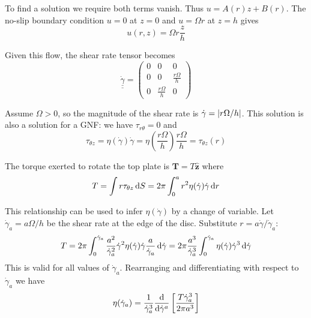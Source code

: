 \documentclass{jknotes}
\newcommand{\dunder}[1]{\underline{\underline{#1}}}
\newcommand{\srate}{\dot{\gamma}}
\begin{document}
To find a solution we require both terms vanish. Thus $u = A(r) z + B(r)$. The
no-slip boundary condition $u = 0$ at $z=0$ and $u = \Omega r$ at $z = h$
gives
\begin{equation}
	u(r,z) = \Omega r \frac{z}{h}
\end{equation}

Given this flow, the shear rate tensor becomes
\begin{equation}
	\dunder{\srate} = \begin{pmatrix} 0 & 0 & 0 \\ 
		0 & 0 & \frac{r \Omega}{h} \\
0 & \frac{r \Omega}{h} & 0 \end{pmatrix}
\end{equation}

Assume $\Omega > 0$, so the magnitude of the shear rate is $\srate =
\abs{r\Omega/h}$. This solution is also a solution for a GNF: we have
$\tau_{r\theta} = 0$ and 
\begin{equation}
	\tau_{\theta z} = \eta(\srate) \srate =
	\eta(\frac{r\Omega}{h})\frac{r\Omega}{h} = \tau_{\theta z} (r)
\end{equation}

The torque exerted to rotate the top plate is $\bm{T} = T\hat{\bm{z}}$ where
\begin{equation}
	T = \int r \tau_{\theta z} \, \diffd S = 2\pi \int_0^a r^2 \eta(\srate)
	\srate \, \diffd r
\end{equation}

This relationship can be used to infer $\eta(\srate)$ by a change of variable.
Let $\srate_a = a\Omega/h$ be the shear rate at the edge of the disc.
Substitute $r = a \srate/\srate_a$:
\begin{equation}
	T = 2\pi \int_0^{\srate_a} \frac{a^2}{\srate_a^2} \srate^2
	\eta(\srate)\srate \frac{a}{\srate_a} \, \diffd \srate = 2\pi
	\frac{a^3}{\srate_a^3} \int_0^{\srate_a} \eta(\srate) \srate^3 \, \diffd
	\srate
\end{equation}
This is valid for all values of $\srate_a$. Rearranging and differentiating
with respect to $\srate_a$ we have
\begin{equation}
	\eta(\srate_a) = \frac{1}{\srate_a^3} \frac{\diffd}{\diffd \srate^a}
	\left[ \frac{T \srate_a^3}{2\pi a^3}\right]
\end{equation}
\end{document}

